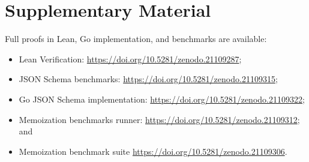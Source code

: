 \documentclass[runningheads]{llncs}
\begin{document}
\section*{Supplementary Material}
\label{supplementary_material}
Full proofs in Lean, Go implementation, and benchmarks are available:
\begin{itemize}\raggedright
\item Lean Verification: \url{https://doi.org/10.5281/zenodo.21109287};
\item JSON Schema benchmarks: \url{https://doi.org/10.5281/zenodo.21109315};
\item Go JSON Schema implementation: \url{https://doi.org/10.5281/zenodo.21109322};
\item Memoization benchmarks runner: \url{https://doi.org/10.5281/zenodo.21109312}; and
\item Memoization benchmark suite \url{https://doi.org/10.5281/zenodo.21109306}.
\end{itemize}




\end{document}
